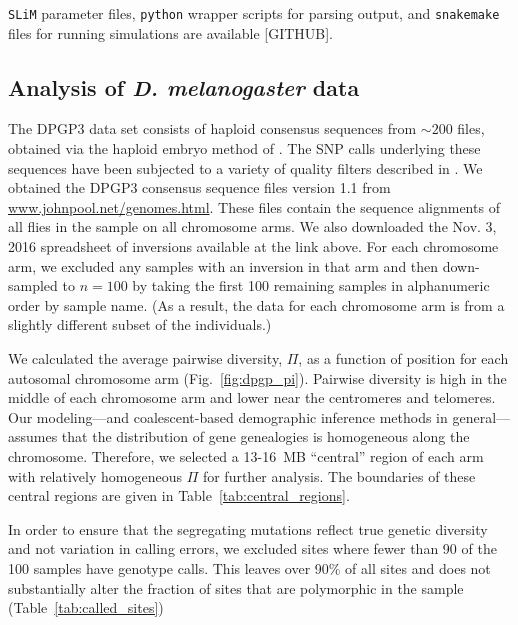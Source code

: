 \documentclass[11pt, letterpaper]{article}   	%
\newcommand{\fig}[1]{Fig.~\ref{#1}}
\begin{document}
\texttt{SLiM} parameter files, \texttt{python} wrapper scripts for parsing output, and \texttt{snakemake} files for running simulations are available [GITHUB].

\subsection*{Analysis of \textit{D. melanogaster} data}

The DPGP3 data set consists of haploid consensus sequences from $\sim 200$ files, obtained via the haploid embryo method of \cite{LangleyEtal2011}.
The SNP calls underlying these sequences have been subjected to a variety of quality filters described in \cite{LackEtAl2015}.
We obtained the DPGP3 consensus sequence files version 1.1 from \url{www.johnpool.net/genomes.html}.
These files contain the sequence alignments of all flies in the sample on all chromosome arms.
We also downloaded the Nov. 3, 2016 spreadsheet of inversions available at the link above.
For each chromosome arm, we excluded any samples with an inversion in that arm and then down-sampled to $n=100$ by taking the first 100 remaining samples in alphanumeric order by sample name.
(As a result, the data for each chromosome arm is from a slightly different subset of the individuals.)

We calculated the average pairwise diversity, $\Pi$, as a function of position for each autosomal chromosome arm (\fig{fig:dpgp_pi}).
Pairwise diversity is high in the middle of each chromosome arm and lower near the centromeres and telomeres.
Our modeling---and coalescent-based demographic inference methods in general---assumes that the distribution of gene genealogies is homogeneous along the chromosome.
Therefore, we selected a 13-16~MB ``central'' region of each arm with relatively homogeneous $\Pi$ for further analysis.
The boundaries of these central regions are given in Table~\ref{tab:central_regions}.

In order to ensure that the segregating mutations reflect true genetic diversity and not variation in calling errors, we excluded sites where fewer than 90 of the 100 samples have genotype calls.
This leaves over 90\% of all sites and does not substantially alter the fraction of sites that are polymorphic in the sample (Table~\ref{tab:called_sites})
\end{document}

